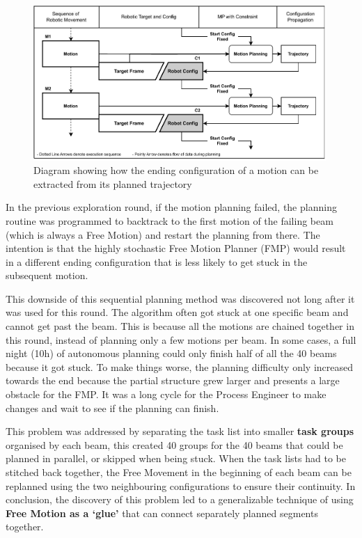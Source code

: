 \begin{figure}[!h]
    \centering
    \includegraphics[width=0.99\textwidth]{images/6a/image8.pdf}
    \caption{Diagram showing how the ending configuration of a motion can be extracted from its planned trajectory}
    \label{fig:extract-ending-configuration}
\end{figure}

In the previous exploration round, if the motion planning failed, the planning routine was programmed to backtrack to the first motion of the failing beam (which is always a Free Motion) and restart the planning from there. The intention is that the highly stochastic Free Motion Planner (FMP) would result in a different ending configuration that is less likely to get stuck in the subsequent motion.

This downside of this sequential planning method was discovered not long after it was used for this round. The algorithm often got stuck at one specific beam and cannot get past the beam. This is because all the motions are chained together in this round, instead of planning only a few motions per beam. In some cases, a full night (10h) of autonomous planning could only finish half of all the 40 beams because it got stuck. To make things worse, the planning difficulty only increased towards the end because the partial structure grew larger and presents a large obstacle for the FMP. It was a long cycle for the Process Engineer to make changes and wait to see if the planning can finish. 

This problem was addressed by separating the task list into smaller \textbf{task groups} organised by each beam, this created 40 groups for the 40 beams that could be planned in parallel, or skipped when being stuck. When the task lists had to be stitched back together, the Free Movement in the beginning of each beam can be replanned using the two neighbouring configurations to ensure their continuity. In conclusion, the discovery of this problem led to a generalizable technique of using \textbf{Free Motion as a ‘glue’} that can connect separately planned segments together.

